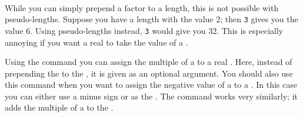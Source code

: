 \begin{Declaration}
    \\
\end{Declaration}
%
%
\begin{Explain}%
  While you can simply prepend a factor to a length, this is not
  possible with pseudo-lengths. Suppose you have a length 
  with the value 2; then \texttt{3} gives you the
  value 6. Using pseudo-lengths instead,
  \texttt{3} would give you
  32. This is especially annoying if you want a real
   to take the value of a .
\end{Explain}
Using the command  you can assign the
multiple of a  to a real .  Here,
instead of prepending the  to the ,
it is given as an optional argument. You should also use this command
when you want to assign the negative value of a 
to a . In this case you can either use a minus sign or
 as the . The command
 works very similarly; it adds the multiple
of a  to the .
%
%
%
%






